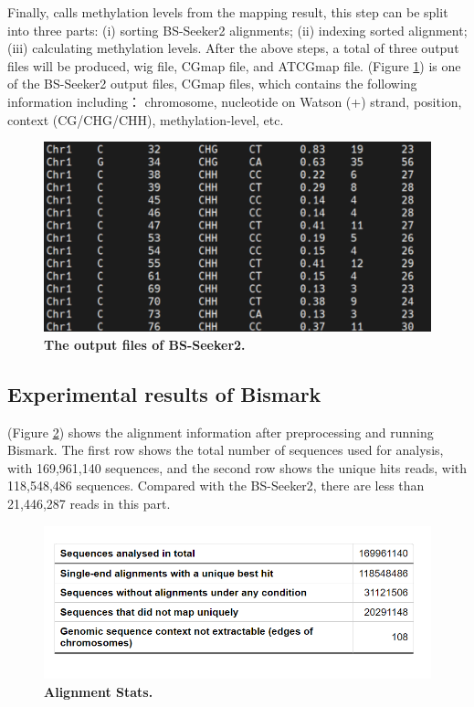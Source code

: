 \documentclass{PHlab-thesis}
\begin{document}
Finally, calls methylation levels from the mapping result, this step can be split into three parts: (i) sorting BS-Seeker2 alignments; (ii) indexing sorted alignment; (iii) calculating methylation levels. After the above steps, a total of three output files will be produced, wig file, CGmap file, and ATCGmap file. (Figure \ref{f6}) is one of the BS-Seeker2 output files, CGmap files, which contains the following information including： chromosome, nucleotide on Watson (+) strand, position, context (CG/CHG/CHH), methylation-level, etc.

\begin{figure}[h]
  \centering
  \includegraphics[scale=0.8]{table/CGmap.png}
  \caption{\textbf{The output files of BS-Seeker2.}
  }
  \label{f6}
\end{figure}


\subsection{Experimental results of Bismark}
(Figure \ref{f7}) shows the alignment information after preprocessing and running Bismark. The first row shows the total number of sequences used for analysis, with 169,961,140 sequences, and the second row shows the unique hits reads, with 118,548,486 sequences. Compared with the BS-Seeker2, there are less than 21,446,287 reads in this part.

\begin{figure}[h]
  \centering
  \includegraphics[scale=0.8]{table/table_alignment_Stats.png}
  \caption{\textbf{Alignment Stats.}
  }
  \label{f7}
\end{figure}
\end{document}
